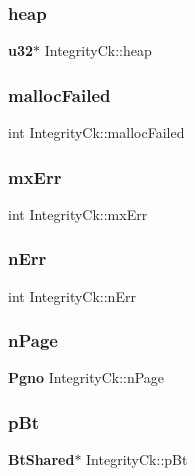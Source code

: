 \mbox{\label{struct_integrity_ck_aada31529ac9fd90643f22cbb79cd916a}} 
\subsubsection{heap}
{\footnotesize\ttfamily \textbf{ u32}$\ast$ Integrity\+Ck\+::heap}

\mbox{\label{struct_integrity_ck_a8e448c1d6483a0326a7ec39291782030}} 
\subsubsection{mallocFailed}
{\footnotesize\ttfamily int Integrity\+Ck\+::malloc\+Failed}

\mbox{\label{struct_integrity_ck_a9daa97cdcb1366c503451ab2af9e7ba6}} 
\subsubsection{mxErr}
{\footnotesize\ttfamily int Integrity\+Ck\+::mx\+Err}

\mbox{\label{struct_integrity_ck_a52c815a1d19be87d0ab4dc0a4e4d38e2}} 
\subsubsection{nErr}
{\footnotesize\ttfamily int Integrity\+Ck\+::n\+Err}

\mbox{\label{struct_integrity_ck_a04f496ef7239aea6dccb6a861bb5a798}} 
\subsubsection{nPage}
{\footnotesize\ttfamily \textbf{ Pgno} Integrity\+Ck\+::n\+Page}

\mbox{\label{struct_integrity_ck_a65f03f54514f504bd871bb2ccd3da188}} 
\subsubsection{pBt}
{\footnotesize\ttfamily \textbf{ Bt\+Shared}$\ast$ Integrity\+Ck\+::p\+Bt}

